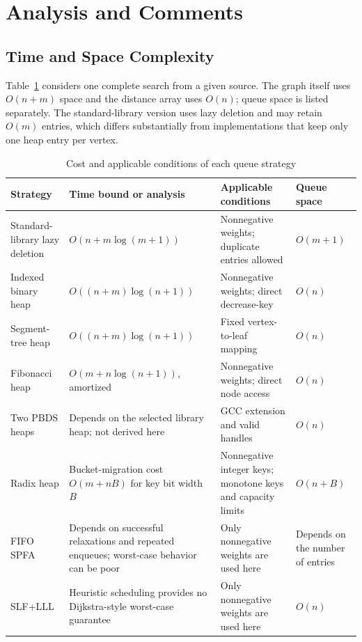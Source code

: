 \section{Analysis and Comments}
\label{sec:analysis}
\subsection{Time and Space Complexity}
Table~\ref{tab:bounds} considers one complete search from a given source. The graph
itself uses $O(n+m)$ space and the distance array uses $O(n)$; queue space is listed
separately. The standard-library version uses lazy deletion and may retain $O(m)$
entries, which differs substantially from implementations that keep only one heap
entry per vertex.

\begin{table}[H]\centering\small
\caption{Cost and applicable conditions of each queue strategy}\label{tab:bounds}
\begin{tabularx}{\linewidth}{%
  >{\raggedright\arraybackslash}p{3.25cm}
  >{\raggedright\arraybackslash}X
  >{\raggedright\arraybackslash}p{3.55cm}
  >{\raggedright\arraybackslash}p{2.2cm}}\toprule
Strategy & Time bound or analysis & Applicable conditions & Queue space\\\midrule
Standard-library lazy deletion & $O(n+m\log(m+1))$ & Nonnegative weights; duplicate entries allowed & $O(m+1)$\\
Indexed binary heap & $O((n+m)\log(n+1))$ & Nonnegative weights; direct decrease-key & $O(n)$\\
Segment-tree heap & $O((n+m)\log(n+1))$ & Fixed vertex-to-leaf mapping & $O(n)$\\
Fibonacci heap & $O(m+n\log(n+1))$, amortized & Nonnegative weights; direct node access & $O(n)$\\
Two PBDS heaps & Depends on the selected library heap; not derived here & GCC extension and valid handles & $O(n)$\\
Radix heap & Bucket-migration cost $O(m+nB)$ for key bit width $B$ & Nonnegative integer keys; monotone keys and capacity limits & $O(n+B)$\\
FIFO SPFA & Depends on successful relaxations and repeated enqueues; worst-case behavior can be poor & Only nonnegative weights are used here & Depends on the number of entries\\
SLF+LLL & Heuristic scheduling provides no Dijkstra-style worst-case guarantee & Only nonnegative weights are used here & $O(n)$\\\bottomrule
\end{tabularx}\end{table}

